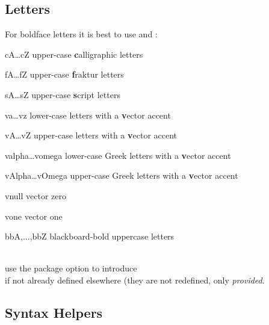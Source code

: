\documentclass[english,a4paper,DIV=12,parskip=full,oneside]{scrartcl}
\begin{document}
    \subsection{Letters}
        \label{subsec:letters}
        For boldface letters it is best to use \codeCommand{\usepackage{bm}} and \codeCommand{\bm}:\\
    \begin{commandlist}
        \item[cA\ldots cZ] upper-case \textbf{c}alligraphic letters \mathCodeExample{\cM, \cN}\\
        \item[fA\ldots fZ] upper-case \textbf{f}raktur letters \mathCodeExample{\fM, \fN, \fX}\\
        \item[sA\ldots sZ] upper-case \textbf{s}cript letters \mathCodeExample{\sM, \sN, \sX}\\
        \item[va\ldots vz] lower-case letters with a \textbf{v}ector accent \mathCodeExample{\va,\vb}
        \item[vA\ldots vZ] upper-case letters with a \textbf{v}ector accent \mathCodeExample{\vA,\vB}
        \item[valpha\ldots vomega] lower-case Greek letters with a \textbf{v}ector accent \mathCodeExample{\valpha,\vbeta}
        \item[vAlpha\ldots vOmega] upper-case Greek letters with a \textbf{v}ector accent \mathCodeExample{\vGamma,\vDelta}
        \item[vnull] vector zero \mathCodeExample{\vnull}
        \item[vone] vector one \mathCodeExample{\vone}
        \item[bbA,...,bbZ] blackboard-bold uppercase letters\par\mathCodeExample{\bbC,\bbK,\bbN,\bbQ,\bbR,\bbS,\bbZ}
        \\[.5\baselineskip] use the package option  to introduce\\
        \mathCodeExample{\C,\K,\N,\Q,\R,\Z} if not already defined elsewhere (\ie they are not redefined, only \emph{provided}.
    \end{commandlist}

    \subsection{Syntax Helpers}\label{subsec:syntax_helpers}
\end{document}
